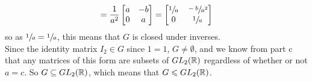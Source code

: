 \documentclass[12pt]{article}
\begin{document}
\begin{enumerate}[label=\textbf{\alph*.}]
\[            = \dfrac{1}{a^2}\begin{bmatrix}
            a & -b \\
            0 & a \\
            \end{bmatrix}
            = \begin{bmatrix}
            \sfrac{1}{a} & \sfrac{-b}{a^2} \\
            0 & \sfrac{1}{a} \\
            \end{bmatrix} \]
            so as $\sfrac{1}{a} = \sfrac{1}{a}$,
            this means that $G$ is closed under inverses. \\
            Since the identity matrix $I_2 \in G$ since $1 = 1$,
            $G \neq \emptyset$,
            and we know from part c that any matrices of this form are
            subsets of $GL_2(\mathbb{R})$ regardless of whether or not $a = c$.
            So $G \subseteq GL_2(\mathbb{R})$,
            which means that $G \leqslant GL_2(\mathbb{R})$.
    \end{enumerate}  
    
    
\end{document}
